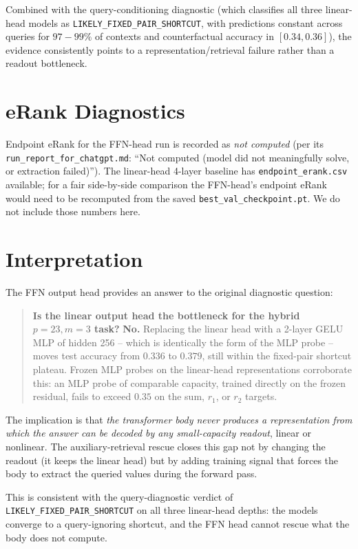 \documentclass[10pt]{article}
\begin{document}
Combined with the query-conditioning diagnostic (which classifies all three linear-head models as \texttt{LIKELY\_FIXED\_PAIR\_SHORTCUT}, with predictions constant across queries for $97{-}99\%$ of contexts and counterfactual accuracy in $[0.34, 0.36]$), the evidence consistently points to a representation/retrieval failure rather than a readout bottleneck.

\section{eRank Diagnostics}

Endpoint eRank for the FFN-head run is recorded as \emph{not computed} (per its \texttt{run\_report\_for\_chatgpt.md}: ``Not computed (model did not meaningfully solve, or extraction failed)''). The linear-head 4-layer baseline has \texttt{endpoint\_erank.csv} available; for a fair side-by-side comparison the FFN-head's endpoint eRank would need to be recomputed from the saved \texttt{best\_val\_checkpoint.pt}. We do not include those numbers here.

\section{Interpretation}

The FFN output head provides an answer to the original diagnostic question:

\begin{quote}
\textbf{Is the linear output head the bottleneck for the hybrid $p=23, m=3$ task?}
\textbf{No.} Replacing the linear head with a 2-layer GELU MLP of hidden 256 -- which is identically the form of the MLP probe -- moves test accuracy from $0.336$ to $0.379$, still within the fixed-pair shortcut plateau. Frozen MLP probes on the linear-head representations corroborate this: an MLP probe of comparable capacity, trained directly on the frozen residual, fails to exceed $0.35$ on the sum, $r_1$, or $r_2$ targets.
\end{quote}

The implication is that \emph{the transformer body never produces a representation from which the answer can be decoded by any small-capacity readout}, linear or nonlinear. The auxiliary-retrieval rescue closes this gap not by changing the readout (it keeps the linear head) but by adding training signal that forces the body to extract the queried values during the forward pass.

This is consistent with the query-diagnostic verdict of \texttt{LIKELY\_FIXED\_PAIR\_SHORTCUT} on all three linear-head depths: the models converge to a query-ignoring shortcut, and the FFN head cannot rescue what the body does not compute.
\end{document}
